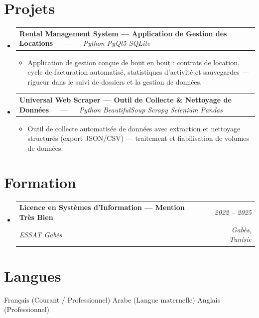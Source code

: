 \documentclass[letterpaper,9pt]{article}
\makeatletter
\newcommand{\resumeItem}[1]{\item\small{#1}}
\newcommand{\resumeSubheading}[4]{
  \vspace{-1pt}\item
  \begin{tabular*}{0.97\textwidth}[t]{l@{\extracolsep{\fill}}r}
    \textbf{#1} & \textit{\color{greytext}#2} \\
    \textit{\small\color{greytext} #3} & \textit{\small\color{greytext} #4}
  \end{tabular*}\vspace{-2pt}
}
\newcommand{\resumeProjectHeading}[2]{
  \item
  \begin{tabular*}{0.97\textwidth}{l@{\extracolsep{\fill}}r}
    \small #1 & #2
  \end{tabular*}\vspace{-1pt}
}
\newcommand{\resumeSubHeadingListStart}{\begin{itemize}[leftmargin=0.18in, label={}, itemsep=1.2pt, topsep=2.5pt, parsep=0pt]}
\newcommand{\resumeSubHeadingListEnd}{\end{itemize}\vspace{-2pt}}
\newcommand{\resumeProjectListStart}{\begin{itemize}[leftmargin=0.24in, label={}, itemsep=0.9pt, topsep=1.2pt, parsep=0pt]}
\newcommand{\resumeProjectListEnd}{\end{itemize}\vspace{-2pt}}
\makeatother
\begin{document}
\section{Projets}
\resumeSubHeadingListStart

  \resumeProjectHeading{\textbf{Rental Management System --- Application de Gestion des Locations} $\quad$ --- $\quad$ \emph{\color{greytext}Python \textperiodcentered{} PyQt5 \textperiodcentered{} SQLite}}{}
    \resumeProjectListStart
      \resumeItem{Application de gestion conçue de bout en bout : contrats de location, cycle de facturation automatisé, statistiques d'activité et sauvegardes — rigueur dans le suivi de dossiers et la gestion de données.}
    \resumeProjectListEnd

  \resumeProjectHeading{\textbf{Universal Web Scraper --- Outil de Collecte \& Nettoyage de Données} $\quad$ --- $\quad$ \emph{\color{greytext}Python \textperiodcentered{} BeautifulSoup \textperiodcentered{} Scrapy \textperiodcentered{} Selenium \textperiodcentered{} Pandas}}{}
    \resumeProjectListStart
      \resumeItem{Outil de collecte automatisée de données avec extraction et nettoyage structurés (export JSON/CSV) — traitement et fiabilisation de volumes de données.}
    \resumeProjectListEnd

\resumeSubHeadingListEnd\vspace{-3pt}

\section{Formation}
\resumeSubHeadingListStart
  \resumeSubheading{Licence en Systèmes d'Information --- Mention Très Bien}{2022 -- 2025}{ESSAT Gabès}{Gabès, Tunisie}
\resumeSubHeadingListEnd\vspace{-1pt}

\section{Langues}
\begin{itemize}[leftmargin=0.18in, label={}, topsep=2pt, itemsep=1pt, parsep=0pt]
\footnotesize{
  \item Français (Courant / Professionnel) \textperiodcentered{} Arabe (Langue maternelle) \textperiodcentered{} Anglais (Professionnel)
}
\end{itemize}
\end{document}
